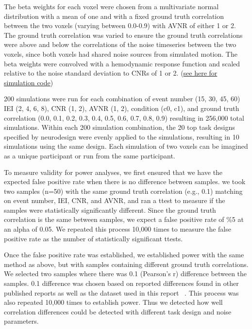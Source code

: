 \documentclass[10pt,letterpaper]{article}
\begin{document}
The beta weights for each voxel were chosen from a multivariate normal distribution
with a mean of one and with a fixed ground truth correlation between the two voxels 
(varying between 0.0-0.9) with AVNR of either 1 or 2.
The ground truth correlation was varied to ensure the ground truth correlations were above
and below the correlations of the noise timeseries between the two voxels,
since both voxels had shared noise sources from simulated motion.
The beta weights were convolved with a hemodynamic response function and scaled
relative to the noise standard deviation to CNRs of 1 or 2.
(\href{https://github.com/jdkent/betaSeriesSimulations/tree/38dfbf2d83a8ab742d134c490b850ad893c8b4c7/beta_sim}{see here for simulation code})

200 simulations were run for each combination of event number
(15, 30, 45, 60) IEI (2, 4, 6, 8),  CNR (1, 2), AVNR (1, 2), condition (c0, c1),
and ground truth correlation
(0.0, 0.1, 0.2, 0.3, 0.4, 0.5, 0.6, 0.7, 0.8, 0.9)
resulting in 256,000 total simulations.
Within each 200 simulation combination, the 20 top task designs specified by
neurodesign were evenly applied to the simulations, resulting in 10 simulations
using the same design.
Each simulation of two voxels can be imagined as a unique participant or run from
the same participant.

To measure validity for power analyses, we first ensured that we have
the expected false positive rate when there is no difference between samples.
we took two samples (n=50) with the same ground truth correlation (e.g., 0.1)
matching on event number, IEI, CNR, and AVNR, and ran a ttest to measure if the samples
were statistically significantly different.
Since the ground truth correlation is the same between samples,
we expect a false positive rate of \%5 at an alpha of 0.05.
We repeated this process 10,000 times to measure the false positive rate as
the number of statistically significant ttests.

Once the false positive rate was established, we established power with the same method as above,
but with samples containing different ground truth correlations.
We selected two samples where there was 0.1 (Pearson's r) difference between the samples.
0.1 difference was chosen based on reported differences found in other published
reports as well as the dataset used in this report ~\cite{Katsura2014,Lee2017,Turner2017,Lin2019,Huang2019}.
This process was also repeated 10,000 times to establish power.
Thus we detected how well correlation differences could be detected
with different task design and noise parameters.
\end{document}
